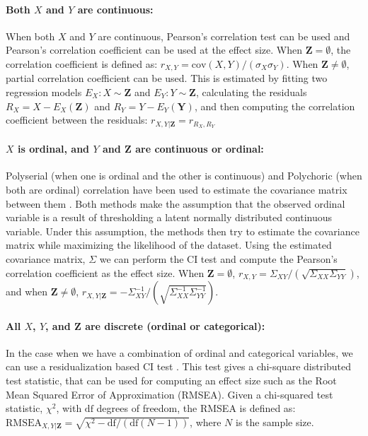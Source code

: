 \documentclass{uai2025} %
\begin{document}
\paragraph{Both $ X $ and $ Y $ are continuous: }
When both $ X $ and $ Y $ are continuous, Pearson's correlation test can be
used and Pearson's correlation coefficient can be used at the effect size. When
$ \bm{Z} = \emptyset $, the correlation coefficient is defined as: $ r_{X, Y} =
\mathrm{cov}(X, Y) / (\sigma_X \sigma_Y) $. When $ \bm{Z} \neq \emptyset $,
partial correlation coefficient can be used. This is estimated by fitting two
regression models $ E_X: X \sim \bm{Z} $ and $ E_Y: Y \sim \bm{Z} $,
calculating the residuals $ R_X = X - E_X(\bm{Z}) $ and $ R_Y = Y - E_Y(\bm{Y})
$, and then computing the correlation coefficient between the residuals: $r_{X,
Y \rvert \bm{Z}} = r_{R_X, R_Y}$

\paragraph{$ X $ is ordinal, and $ Y $ and $ \bm{Z} $  are continuous or ordinal: }

Polyserial (when one is ordinal and the other is continuous) and Polychoric
(when both are ordinal) correlation have been used to estimate the covariance
matrix between them \citep{Poon1987}. Both methods make the assumption that the
observed ordinal variable is a result of thresholding a latent normally
distributed continuous variable. Under this assumption, the methods then try to
estimate the covariance matrix while maximizing the likelihood of the dataset.
Using the estimated covariance matrix, $ \Sigma $ we can perform the CI test
and compute the Pearson's correlation coefficient as the effect size. When 
$\bm{Z} = \emptyset $, $ r_{X, Y} = \Sigma_{XY} / (\sqrt{\Sigma_{XX} \Sigma_{YY}}) $, 
	and when $ \bm{Z} \ne \emptyset $,
	$ r_{X, Y \rvert \bm{Z}} = - \Sigma^{-1}_{XY}/ (\sqrt{\Sigma^{-1}_{XX} \Sigma^{-1}_{YY}}) $.

\paragraph{All $ X $, $ Y $, and $ \bm{Z} $ are discrete (ordinal or categorical): }

In the case when we have a combination of ordinal and categorical variables, we
can use a residualization based CI test \citep{Ankan2023}. This test gives a
chi-square distributed test statistic, that can be used for computing an effect
size such as the Root Mean Squared Error of Approximation (RMSEA). Given a
chi-squared test statistic, $ \chi^2 $, with $ \textrm{df} $ degrees of
freedom, the RMSEA is defined as: $ \textrm{RMSEA}_{X, Y \rvert \bm{Z}} =
\sqrt{\chi^2 - \textrm{df}/ (\textrm{df} (N-1))} $, where $ N $ is the sample
size.
\end{document}

